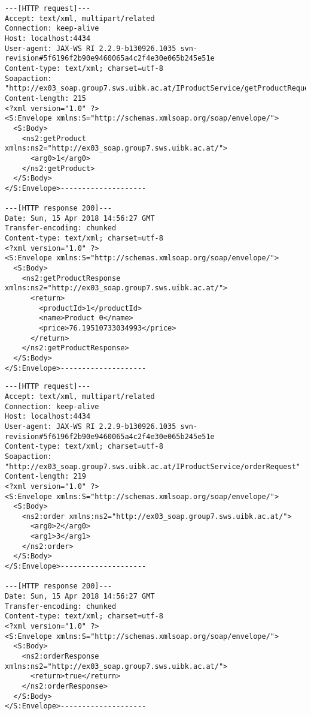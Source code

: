 \documentclass[a4paper]{article}
\begin{document}
\begin{lstlisting}[caption=Request \& Response for \emph{getProduct()}]
---[HTTP request]---
Accept: text/xml, multipart/related
Connection: keep-alive
Host: localhost:4434
User-agent: JAX-WS RI 2.2.9-b130926.1035 svn-revision#5f6196f2b90e9460065a4c2f4e30e065b245e51e
Content-type: text/xml; charset=utf-8
Soapaction: "http://ex03_soap.group7.sws.uibk.ac.at/IProductService/getProductRequest"
Content-length: 215
<?xml version="1.0" ?>
<S:Envelope xmlns:S="http://schemas.xmlsoap.org/soap/envelope/">
  <S:Body>
    <ns2:getProduct xmlns:ns2="http://ex03_soap.group7.sws.uibk.ac.at/">
      <arg0>1</arg0>
    </ns2:getProduct>
  </S:Body>
</S:Envelope>--------------------

---[HTTP response 200]---
Date: Sun, 15 Apr 2018 14:56:27 GMT
Transfer-encoding: chunked
Content-type: text/xml; charset=utf-8
<?xml version="1.0" ?>
<S:Envelope xmlns:S="http://schemas.xmlsoap.org/soap/envelope/">
  <S:Body>
    <ns2:getProductResponse xmlns:ns2="http://ex03_soap.group7.sws.uibk.ac.at/">
      <return>
        <productId>1</productId>
        <name>Product 0</name>
        <price>76.19510733034993</price>
      </return>
    </ns2:getProductResponse>
  </S:Body>
</S:Envelope>--------------------
\end{lstlisting}\vspace{0.5cm}

\begin{lstlisting}[caption=Request \& Response for \emph{order()}]
---[HTTP request]---
Accept: text/xml, multipart/related
Connection: keep-alive
Host: localhost:4434
User-agent: JAX-WS RI 2.2.9-b130926.1035 svn-revision#5f6196f2b90e9460065a4c2f4e30e065b245e51e
Content-type: text/xml; charset=utf-8
Soapaction: "http://ex03_soap.group7.sws.uibk.ac.at/IProductService/orderRequest"
Content-length: 219
<?xml version="1.0" ?>
<S:Envelope xmlns:S="http://schemas.xmlsoap.org/soap/envelope/">
  <S:Body>
    <ns2:order xmlns:ns2="http://ex03_soap.group7.sws.uibk.ac.at/">
      <arg0>2</arg0>
      <arg1>3</arg1>
    </ns2:order>
  </S:Body>
</S:Envelope>--------------------

---[HTTP response 200]---
Date: Sun, 15 Apr 2018 14:56:27 GMT
Transfer-encoding: chunked
Content-type: text/xml; charset=utf-8
<?xml version="1.0" ?>
<S:Envelope xmlns:S="http://schemas.xmlsoap.org/soap/envelope/">
  <S:Body>
    <ns2:orderResponse xmlns:ns2="http://ex03_soap.group7.sws.uibk.ac.at/">
      <return>true</return>
    </ns2:orderResponse>
  </S:Body>
</S:Envelope>--------------------
\end{lstlisting}\vspace{0.5cm}
\end{document}
